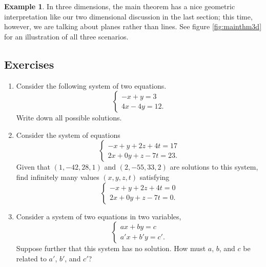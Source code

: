 \documentclass[a4paper,leqno]{article}
\numberwithin{equation}{section}
\theoremstyle{definition}
\newtheorem{ex}[equation]{Example}
\theoremstyle{remark}
\begin{document}
\begin{ex}
  In three dimensions, the main theorem has a nice geometric interpretation like our two dimensional discussion in the last section;
  this time, however, we are talking about planes rather than lines. See figure \ref{fig:mainthm3d} for an illustration of all three
  scenarios.
\end{ex}

\subsection*{Exercises}
\begin{enumerate}
  \item Consider the following system of two equations.
        \begin{equation*}
          \begin{cases}
            - x + y = 3\\
            4x - 4y = 12.
          \end{cases}
        \end{equation*}
        Write down all possible solutions.
  \item Consider the system of equations
        \begin{equation*}
          \begin{cases}
            -x + y + 2z + 4t = 17\\
            2x + 0y + z - 7t = 23.
          \end{cases}
        \end{equation*}
        Given that $ (1,-42,28,1) $ and $ (2, -55, 33, 2) $ are solutions to this system, find infinitely many values $ (x,y,z,t) $ satisfying
        \begin{equation*}
          \begin{cases}
            -x + y + 2z + 4t = 0\\
            2x + 0y + z - 7t = 0.
          \end{cases}
        \end{equation*}
  \item Consider a system of two equations in two variables,
        \begin{equation*}
          \begin{cases}
            ax + by = c\\
            a'x + b'y = c'.
          \end{cases}
        \end{equation*}
        Suppose further that this system has no solution. How must $ a $, $ b $, and $ c $ be related to $ a' $, $ b' $, and $ c' $?
\end{enumerate}
\end{document}
